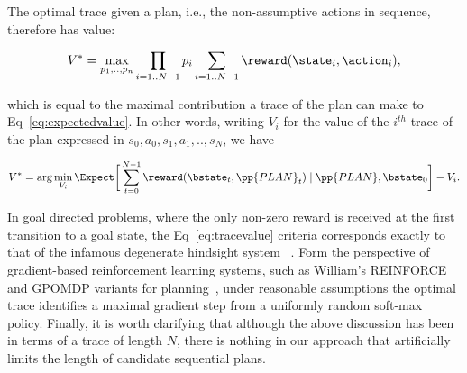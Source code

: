 \noindent The optimal trace given a plan, i.e., the non-assumptive
actions in sequence, therefore has value:

\[
V^* = \max_{p_1, .., p_n} \prod_{i=1..N-1} p_i \sum_{i=1..N-1}
\reward(\state_i, \action_i),
\]

\noindent which is equal to the maximal contribution a trace of the plan can
make to Eq~\ref{eq:expectedvalue}. In other words, writing $V_i$ for
the value of the $i^{th}$ trace of the plan expressed in $s_0, a_0,
s_1, a_1,.., s_N$, we have

\[
V^* = \arg\min_{V_i} \Expect \bigg{[} 
\sum_{t=0}^{N-1}  \reward(\bstate_t, \pp{PLAN}_t) \mid \pp{PLAN}, \bstate_0
\bigg{]} - V_i.
\]

In goal directed problems, where the only non-zero reward is received
at the first transition to a goal state, the Eq~\ref{eq:tracevalue}
criteria corresponds exactly to that of the infamous degenerate
hindsight system
~\cite{yoon:etal:2007}. Form the perspective of
gradient-based reinforcement learning systems, such as William's
REINFORCE and GPOMDP variants for planning~\cite{olivier:doug:2009},
under reasonable assumptions the optimal trace identifies a maximal
gradient step from a uniformly random soft-max policy. Finally, it is
worth clarifying that although the above discussion has been in terms
of a trace of length $N$, there is nothing in our approach that
artificially limits the length of candidate sequential plans.





